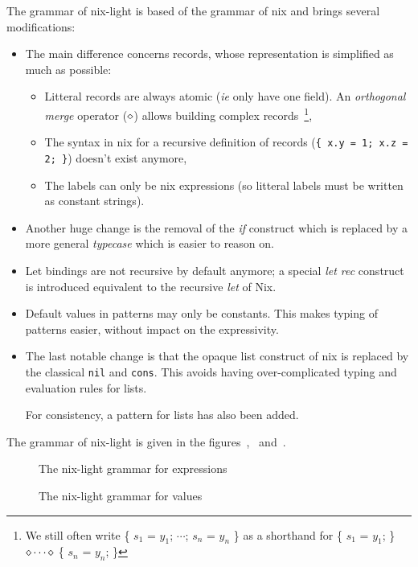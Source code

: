 The grammar of nix-light is based of the grammar of nix and brings several
modifications:
\begin{itemize}
  \item The main difference concerns records, whose representation is simplified as
    much as possible:

    \begin{itemize}
      \item Litteral records are always atomic (\emph{ie} only have one field). An
        \emph{orthogonal merge} operator ($\diamond$) allows building complex
        records~\footnote{We still often write \{ $s_1$ = $y_1$; $\cdots{}$;
        $s_n$ = $y_n$ \} as a shorthand for \{ $s_1$ = $y_1$; \} $\diamond
        \cdots{} \diamond$ \{ $s_n$ = $y_n$; \}},

      \item The syntax in nix for a recursive definition of records (\texttt{\{ x.y
        = 1; x.z = 2; \}}) doesn't exist anymore,

      \item The labels can only be nix expressions (so litteral labels must be
        written as constant strings).
    \end{itemize}

  \item Another huge change is the removal of the \emph{if} construct which is
    replaced by a more general \emph{typecase} which is easier to reason on.

  \item Let bindings are not recursive by default anymore; a special \emph{let
    rec} construct is introduced equivalent to the recursive \emph{let} of Nix.

  \item Default values in patterns may only be constants. This makes typing of
    patterns easier, without impact on the expressivity.

  \item The last notable change is that the opaque list construct of nix is
    replaced by the classical \texttt{nil} and \texttt{cons}.
    This avoids having over-complicated typing and evaluation rules for lists.

    For consistency, a pattern for lists has also been added.
\end{itemize}

The grammar of nix-light is given in the
figures~,~
and~.

\begin{figure}
  
  \caption{\label{grammar::expressions}The nix-light grammar for expressions}
\end{figure}

\begin{figure}
  
  \caption{\label{grammar::values}The nix-light grammar for values}
\end{figure}
